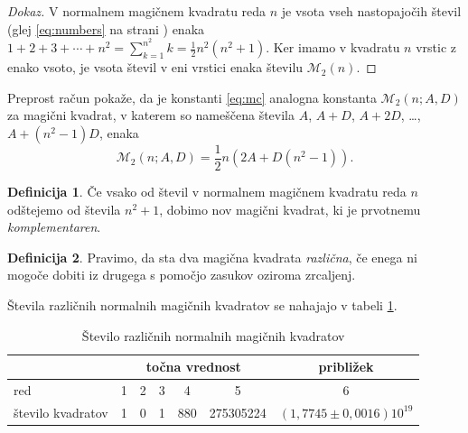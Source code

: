\documentclass[a4paper,12pt]{article}
\theoremstyle{definition}
\newtheorem{definicija}{Definicija}
\newenvironment{dokaz}{\begin{proof}[Dokaz]}{\end{proof}}
\begin{document}
\begin{dokaz}
  V normalnem magičnem kvadratu reda \(n\) je vsota vseh nastopajočih
   števil (glej \eqref{eq:numbers} na strani \pageref{eq:numbers}) enaka
   \(1+2+3+\cdots+n^2 = \sum_{k=1}^{n^2} k = \frac{1}{2}n^2(n^2+1)\).
   Ker imamo v kvadratu \(n\) vrstic z enako vsoto, je vsota števil v eni vrstici
   enaka številu \(\mathcal{M}_2(n)\). %
\end{dokaz}   

Preprost račun pokaže, da je konstanti \eqref{eq:mc} analogna konstanta
\(\mathcal{M}_2(n; A, D)\) za magični kvadrat, v katerem so nameščena števila
\(A\), \(A+D\), \(A+2D\), \ldots, \(A+(n^2-1)D\), enaka
\begin{equation*}
   \mathcal{M}_2(n; A, D) = \frac{1}{2}n \left(2A + D(n^2 - 1)\right).
\end{equation*}

 \begin{definicija}
      Če vsako od števil v normalnem magičnem kvadratu reda \(n\) odštejemo
      od števila \(n^2+1\), dobimo nov magični kvadrat, ki je prvotnemu
      \emph{komplementaren}.
 \end{definicija}

 \begin{definicija}
      Pravimo, da sta dva magična kvadrata \emph{različna}, če enega ni mogoče dobiti
      iz drugega s pomočjo zasukov oziroma zrcaljenj.
 \end{definicija}

Števila različnih normalnih magičnih kvadratov se nahajajo v tabeli \ref{table:stevila}.

\begin{table}[h]
   \centering
   \caption{Število različnih normalnih magičnih kvadratov}
   \label{table:stevila}
   \begin{tabular}{l ccccc c}
      \hline
      & \multicolumn{5}{c}{točna vrednost} & približek \\
      \hline
      red & 1 & 2 & 3 & 4 & 5 & 6 \\
      število kvadratov & 1 & 0 & 1 & 880 & 275305224 & \((1{,}7745 \pm 0{,}0016)10^{19}\) \\
      \hline
   \end{tabular}
\end{table}
\end{document}
